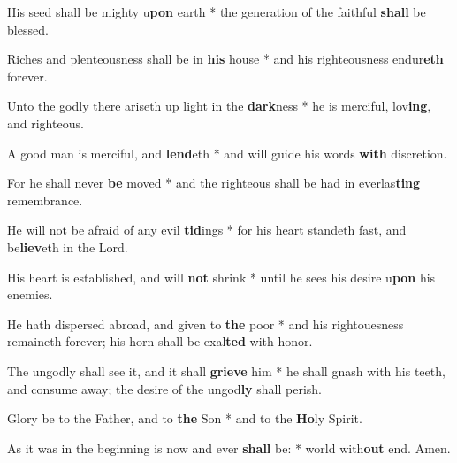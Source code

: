 \begin{multicols}{2}
	His seed shall be mighty u\textbf{pon} earth * the generation of the faithful \textbf{shall} be blessed.
	
	Riches and plenteousness shall be in \textbf{his} house * and his righteousness endur\textbf{eth} forever.
	
	Unto the godly there ariseth up light in the \textbf{dark}ness * he is merciful, lov\textbf{ing}, and righteous.
	
	A good man is merciful, and \textbf{lend}eth * and will guide his words \textbf{with} discretion.
	
	For he shall never \textbf{be} moved * and the righteous shall be had in everlas\textbf{ting} remembrance.
	
	He will not be afraid of any evil \textbf{tid}ings * for his heart standeth fast, and be\textbf{liev}eth in the Lord.
	
	His heart is established, and will \textbf{not} shrink * until he sees his desire u\textbf{pon} his enemies.
	
	He hath dispersed abroad, and given to \textbf{the} poor * and his rightouesness remaineth forever; his horn shall be exal\textbf{ted} with honor.
	
	The ungodly shall see it, and it shall \textbf{grieve} him * he shall gnash with his teeth, and consume away; the desire of the ungod\textbf{ly} shall perish.
	
	Glory be to the Father, and to \textbf{the} Son * and to the \textbf{Ho}ly Spirit.
	
	As it was in the beginning is now and ever \textbf{shall} be: * world with\textbf{out} end. Amen.
\end{multicols}